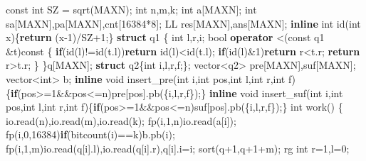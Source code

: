 \documentclass[
]{article}
\newenvironment{Shaded}{}{}
\newcommand{\AttributeTok}[1]{\textcolor[rgb]{0.49,0.56,0.16}{#1}}
\newcommand{\ControlFlowTok}[1]{\textcolor[rgb]{0.00,0.44,0.13}{\textbf{#1}}}
\newcommand{\DataTypeTok}[1]{\textcolor[rgb]{0.56,0.13,0.00}{#1}}
\newcommand{\DecValTok}[1]{\textcolor[rgb]{0.25,0.63,0.44}{#1}}
\newcommand{\KeywordTok}[1]{\textcolor[rgb]{0.00,0.44,0.13}{\textbf{#1}}}
\newcommand{\NormalTok}[1]{#1}
\begin{document}
\begin{Shaded}
\begin{Highlighting}[]
\AttributeTok{const} \DataTypeTok{int}\NormalTok{ SZ = sqrt(MAXN);}
\DataTypeTok{int}\NormalTok{ n,m,k;}
\DataTypeTok{int}\NormalTok{ a[MAXN];}
\DataTypeTok{int}\NormalTok{ sa[MAXN],pa[MAXN],cnt[}\DecValTok{16384}\NormalTok{*}\DecValTok{8}\NormalTok{];}
\NormalTok{LL  res[MAXN],ans[MAXN];}
\KeywordTok{inline} \DataTypeTok{int}\NormalTok{ id(}\DataTypeTok{int}\NormalTok{ x)\{}\ControlFlowTok{return}\NormalTok{ (x{-}}\DecValTok{1}\NormalTok{)/SZ+}\DecValTok{1}\NormalTok{;\}}
\KeywordTok{struct}\NormalTok{ q1}
\NormalTok{\{}
    \DataTypeTok{int}\NormalTok{ l,r,i;}
    \DataTypeTok{bool} \KeywordTok{operator}\NormalTok{ \textless{}(}\AttributeTok{const}\NormalTok{ q1 \&t)}\AttributeTok{const}
\NormalTok{    \{}
        \ControlFlowTok{if}\NormalTok{(id(l)!=id(t.l))}\ControlFlowTok{return}\NormalTok{ id(l)\textless{}id(t.l);}
        \ControlFlowTok{if}\NormalTok{(id(l)\&}\DecValTok{1}\NormalTok{)}\ControlFlowTok{return}\NormalTok{ r\textless{}t.r;}
        \ControlFlowTok{return}\NormalTok{ r\textgreater{}t.r;}
\NormalTok{    \}}
\NormalTok{\}q[MAXN];}
\KeywordTok{struct}\NormalTok{ q2\{}\DataTypeTok{int}\NormalTok{ i,l,r,f;\};}
\NormalTok{vector\textless{}q2\textgreater{} pre[MAXN],suf[MAXN];}
\NormalTok{vector\textless{}}\DataTypeTok{int}\NormalTok{\textgreater{} b;}
\KeywordTok{inline} \DataTypeTok{void}\NormalTok{ insert\_pre(}\DataTypeTok{int}\NormalTok{ i,}\DataTypeTok{int}\NormalTok{ pos,}\DataTypeTok{int}\NormalTok{ l,}\DataTypeTok{int}\NormalTok{ r,}\DataTypeTok{int}\NormalTok{ f)\{}\ControlFlowTok{if}\NormalTok{(pos\textgreater{}=}\DecValTok{1}\NormalTok{\&\&pos\textless{}=n)pre[pos].pb(\{i,l,r,f\});\}}
\KeywordTok{inline} \DataTypeTok{void}\NormalTok{ insert\_suf(}\DataTypeTok{int}\NormalTok{ i,}\DataTypeTok{int}\NormalTok{ pos,}\DataTypeTok{int}\NormalTok{ l,}\DataTypeTok{int}\NormalTok{ r,}\DataTypeTok{int}\NormalTok{ f)\{}\ControlFlowTok{if}\NormalTok{(pos\textgreater{}=}\DecValTok{1}\NormalTok{\&\&pos\textless{}=n)suf[pos].pb(\{i,l,r,f\});\}}
\DataTypeTok{int}\NormalTok{ work()}
\NormalTok{\{}
\NormalTok{    io.read(n),io.read(m),io.read(k);}
\NormalTok{    fp(i,}\DecValTok{1}\NormalTok{,n)io.read(a[i]);}
\NormalTok{    fp(i,}\DecValTok{0}\NormalTok{,}\DecValTok{16384}\NormalTok{)}\ControlFlowTok{if}\NormalTok{(bitcount(i)==k)b.pb(i);}
\NormalTok{    fp(i,}\DecValTok{1}\NormalTok{,m)io.read(q[i].l),io.read(q[i].r),q[i].i=i;}
\NormalTok{    sort(q+}\DecValTok{1}\NormalTok{,q+}\DecValTok{1}\NormalTok{+m);}
\NormalTok{    rg }\DataTypeTok{int}\NormalTok{ r=}\DecValTok{1}\NormalTok{,l=}\DecValTok{0}\NormalTok{;}

\end{Highlighting}
\end{Shaded}
\end{document}
